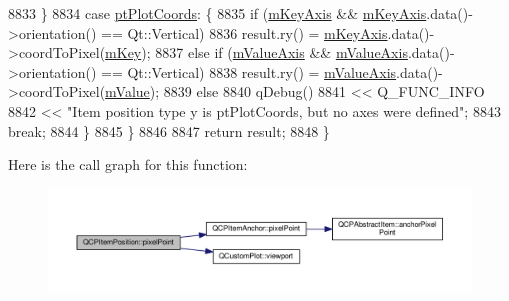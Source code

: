 \begin{DoxyCode}
8833   \}
8834   \textcolor{keywordflow}{case} \hyperlink{class_q_c_p_item_position_aad9936c22bf43e3d358552f6e86dbdc8ad5ffb8dc99ad73263f7010c77342294c}{ptPlotCoords}: \{
8835     \textcolor{keywordflow}{if} (\hyperlink{class_q_c_p_item_position_a63967a33933231e92f68c8ce06bfc37e}{mKeyAxis} && \hyperlink{class_q_c_p_item_position_a63967a33933231e92f68c8ce06bfc37e}{mKeyAxis}.data()->orientation() == Qt::Vertical)
8836       result.ry() = \hyperlink{class_q_c_p_item_position_a63967a33933231e92f68c8ce06bfc37e}{mKeyAxis}.data()->coordToPixel(\hyperlink{class_q_c_p_item_position_a4ff3931ad115603dfb4c7000b24bb415}{mKey});
8837     \textcolor{keywordflow}{else} \textcolor{keywordflow}{if} (\hyperlink{class_q_c_p_item_position_a505dc2da24ba274452c1c817fcaba011}{mValueAxis} && \hyperlink{class_q_c_p_item_position_a505dc2da24ba274452c1c817fcaba011}{mValueAxis}.data()->orientation() == Qt::Vertical)
8838       result.ry() = \hyperlink{class_q_c_p_item_position_a505dc2da24ba274452c1c817fcaba011}{mValueAxis}.data()->coordToPixel(\hyperlink{class_q_c_p_item_position_a67bf5df69f587d53731724a7d61c6c3f}{mValue});
8839     \textcolor{keywordflow}{else}
8840       qDebug()
8841           << Q\_FUNC\_INFO
8842           << \textcolor{stringliteral}{"Item position type y is ptPlotCoords, but no axes were defined"};
8843     \textcolor{keywordflow}{break};
8844   \}
8845   \}
8846 
8847   \textcolor{keywordflow}{return} result;
8848 \}
\end{DoxyCode}


Here is the call graph for this function\+:\nopagebreak
\begin{figure}[H]
\begin{center}
\leavevmode
\includegraphics[width=350pt]{class_q_c_p_item_position_ae490f9c76ee2ba33752c495d3b6e8fb5_cgraph}
\end{center}
\end{figure}




